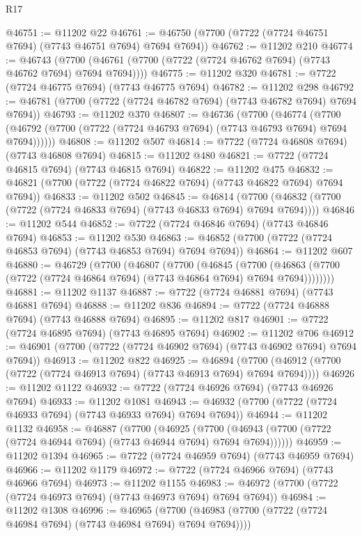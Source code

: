 \begin{lexlean}{R17}
\begin{coremodule}
@46751 := @11202 @22
@46761 := @46750 (@7700 (@7722 (@7724 @46751 @7694) (@7743 @46751 @7694) @7694 @7694))
@46762 := @11202 @210
@46774 := @46743
    (@7700 (@46761 (@7700 (@7722 (@7724 @46762 @7694) (@7743 @46762 @7694) @7694 @7694))))
@46775 := @11202 @320
@46781 := @7722 (@7724 @46775 @7694) (@7743 @46775 @7694)
@46782 := @11202 @298
@46792 := @46781 (@7700 (@7722 (@7724 @46782 @7694) (@7743 @46782 @7694) @7694 @7694))
@46793 := @11202 @370
@46807 := @46736
    (@7700
      (@46774
        (@7700 (@46792 (@7700 (@7722 (@7724 @46793 @7694) (@7743 @46793 @7694) @7694 @7694))))))
@46808 := @11202 @507
@46814 := @7722 (@7724 @46808 @7694) (@7743 @46808 @7694)
@46815 := @11202 @480
@46821 := @7722 (@7724 @46815 @7694) (@7743 @46815 @7694)
@46822 := @11202 @475
@46832 := @46821 (@7700 (@7722 (@7724 @46822 @7694) (@7743 @46822 @7694) @7694 @7694))
@46833 := @11202 @502
@46845 := @46814
    (@7700 (@46832 (@7700 (@7722 (@7724 @46833 @7694) (@7743 @46833 @7694) @7694 @7694))))
@46846 := @11202 @544
@46852 := @7722 (@7724 @46846 @7694) (@7743 @46846 @7694)
@46853 := @11202 @530
@46863 := @46852 (@7700 (@7722 (@7724 @46853 @7694) (@7743 @46853 @7694) @7694 @7694))
@46864 := @11202 @607
@46880 := @46729
    (@7700
      (@46807
        (@7700
          (@46845
            (@7700
              (@46863 (@7700 (@7722 (@7724 @46864 @7694) (@7743 @46864 @7694) @7694 @7694))))))))
@46881 := @11202 @1137
@46887 := @7722 (@7724 @46881 @7694) (@7743 @46881 @7694)
@46888 := @11202 @836
@46894 := @7722 (@7724 @46888 @7694) (@7743 @46888 @7694)
@46895 := @11202 @817
@46901 := @7722 (@7724 @46895 @7694) (@7743 @46895 @7694)
@46902 := @11202 @706
@46912 := @46901 (@7700 (@7722 (@7724 @46902 @7694) (@7743 @46902 @7694) @7694 @7694))
@46913 := @11202 @822
@46925 := @46894
    (@7700 (@46912 (@7700 (@7722 (@7724 @46913 @7694) (@7743 @46913 @7694) @7694 @7694))))
@46926 := @11202 @1122
@46932 := @7722 (@7724 @46926 @7694) (@7743 @46926 @7694)
@46933 := @11202 @1081
@46943 := @46932 (@7700 (@7722 (@7724 @46933 @7694) (@7743 @46933 @7694) @7694 @7694))
@46944 := @11202 @1132
@46958 := @46887
    (@7700
      (@46925
        (@7700 (@46943 (@7700 (@7722 (@7724 @46944 @7694) (@7743 @46944 @7694) @7694 @7694))))))
@46959 := @11202 @1394
@46965 := @7722 (@7724 @46959 @7694) (@7743 @46959 @7694)
@46966 := @11202 @1179
@46972 := @7722 (@7724 @46966 @7694) (@7743 @46966 @7694)
@46973 := @11202 @1155
@46983 := @46972 (@7700 (@7722 (@7724 @46973 @7694) (@7743 @46973 @7694) @7694 @7694))
@46984 := @11202 @1308
@46996 := @46965
    (@7700 (@46983 (@7700 (@7722 (@7724 @46984 @7694) (@7743 @46984 @7694) @7694 @7694))))

\end{coremodule}
\end{lexlean}
